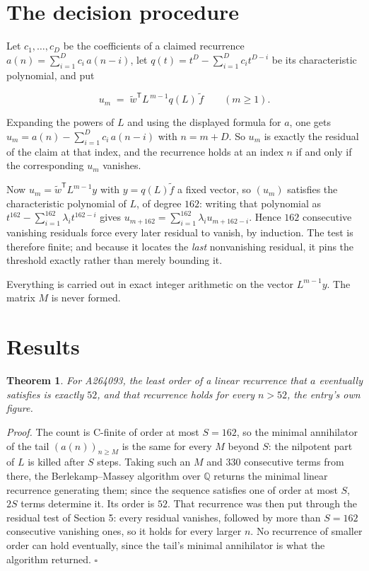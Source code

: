 \documentclass[11pt]{article}
\newtheorem{theorem}{Theorem}
\theoremstyle{definition}
\begin{document}
\section{The decision procedure}

Let $c_1,\dots,c_D$ be the coefficients of a claimed recurrence $a(n) = \sum_{i=1}^{D} c_i\,a(n-i)$, let $q(t) = t^{D} - \sum_{i=1}^{D} c_i t^{D-i}$ be its characteristic polynomial, and put

\[u_m \;=\; \tilde w^{\mathsf T} L^{\,m-1} q(L)\,\tilde f \qquad (m \ge 1).\]

Expanding the powers of $L$ and using the displayed formula for $a$, one gets $u_m = a(n) - \sum_{i=1}^{D} c_i\,a(n-i)$ with $n = m + D$. So $u_m$ is exactly the residual of the claim at that index, and the recurrence holds at an index $n$ if and only if the corresponding $u_m$ vanishes.

Now $u_m = \tilde w^{\mathsf T} L^{m-1} y$ with $y = q(L)\tilde f$ a fixed vector, so $(u_m)$ satisfies the characteristic polynomial of $L$, of degree $162$: writing that polynomial as $t^{162} - \sum_{i=1}^{162} \lambda_i t^{162-i}$ gives $u_{m+162} = \sum_{i=1}^{162} \lambda_i u_{m+162-i}$. Hence $162$ consecutive vanishing residuals force every later residual to vanish, by induction. The test is therefore finite; and because it locates the {\itshape last} nonvanishing residual, it pins the threshold exactly rather than merely bounding it.

Everything is carried out in exact integer arithmetic on the vector $L^{m-1}y$. The matrix $M$ is never formed.

\section{Results}

\begin{theorem} For A264093, the least order of a linear recurrence that $a$ eventually satisfies is exactly $52$, and that recurrence holds for every $n > 52$, the entry's own figure.\end{theorem}

{\itshape Proof.} The count is C-finite of order at most $S = 162$, so the minimal annihilator of the tail $(a(n))_{n \ge M}$ is the same for every $M$ beyond $S$: the nilpotent part of $L$ is killed after $S$ steps. Taking such an $M$ and $330$ consecutive terms from there, the Berlekamp--Massey algorithm over $\mathbb{Q}$ returns the minimal linear recurrence generating them; since the sequence satisfies one of order at most $S$, $2S$ terms determine it. Its order is $52$. That recurrence was then put through the residual test of Section 5: every residual vanishes, followed by more than $S = 162$ consecutive vanishing ones, so it holds for every larger $n$. No recurrence of smaller order can hold eventually, since the tail's minimal annihilator is what the algorithm returned. $\square$
\end{document}
